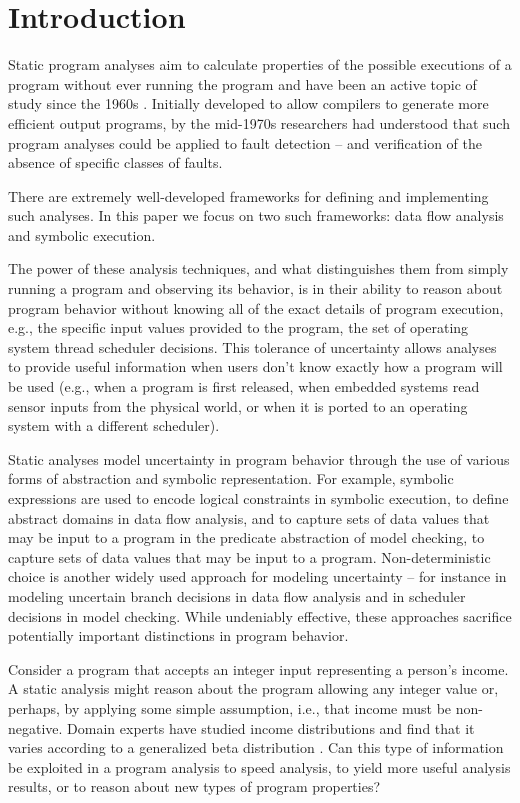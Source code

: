 \section{Introduction}
\label{sec:introduction}

Static program analyses aim to calculate properties of 
the possible executions of a program without ever running the program
and have been an active topic of study since the 1960s \cite{First}.
Initially developed to allow compilers to generate more efficient
output programs, by the mid-1970s \cite{Fosdick} researchers had
understood that such program analyses could be applied to fault
detection -- and verification of the absence of specific classes of faults.

There are extremely well-developed frameworks for defining
and implementing such analyses.  In this paper we focus on two
such frameworks: data flow analysis and symbolic execution.

The power of these analysis techniques, and what distinguishes them from
simply running a program and observing its behavior, is in their
ability to reason about program behavior without knowing all of the
exact details of program execution, e.g., the specific 
input values provided to the program, the set of operating system
thread scheduler decisions.  This tolerance of uncertainty allows analyses
to provide useful information when users don't know exactly how
a program will be used (e.g., when a program is first released, when
embedded systems read sensor inputs from the physical world, or
when it is ported to an operating system with a different scheduler).

Static analyses model uncertainty in program behavior
through the use of various forms of abstraction and symbolic representation.
For example, symbolic expressions are used to encode logical constraints 
in symbolic execution, to define abstract domains
in data flow analysis, and to capture sets of data values that may be input
to a program in the predicate abstraction of model checking, 
to capture sets of data values that may be input to a program.
Non-deterministic choice is another widely used approach for modeling
uncertainty -- for instance in modeling uncertain branch 
decisions in data flow analysis and
in scheduler decisions in model checking.
While undeniably effective, these approaches sacrifice potentially
important distinctions in program behavior.   

Consider a program that accepts an integer input representing
a person's income.  A static analysis might reason about the program
allowing any integer value or, perhaps, by applying
some simple assumption, i.e., that income must be non-negative.
Domain experts have studied income distributions and find that
it varies according to a generalized beta distribution 
\cite{IncomeDistribution}.  Can this type of information be 
exploited in a program analysis to speed analysis,
to yield more useful analysis results, or to reason 
about new types of program properties?

